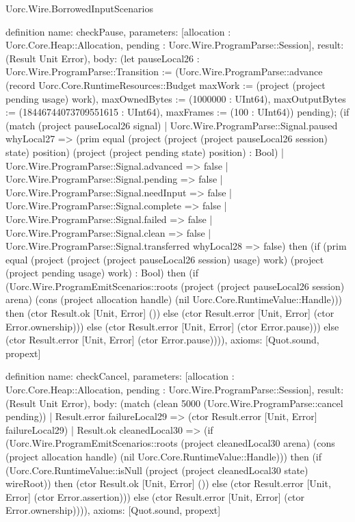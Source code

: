 \begin{lexlean}{Uorc.Wire.BorrowedInputScenarios}
\begin{semanticmodule}
definition{
  name: checkPause,
  parameters: [allocation : Uorc.Core.Heap::Allocation, pending : Uorc.Wire.ProgramParse::Session],
  result: (Result Unit Error),
  body: (let pauseLocal26 : Uorc.Wire.ProgramParse::Transition := (Uorc.Wire.ProgramParse::advance (record Uorc.Core.RuntimeResources::Budget {maxWork := (project (project pending usage) work), maxOwnedBytes := (1000000 : UInt64), maxOutputBytes := (18446744073709551615 : UInt64), maxFrames := (100 : UInt64)}) pending); (if (match (project pauseLocal26 signal)
    | Uorc.Wire.ProgramParse::Signal.paused whyLocal27 => (prim equal (project (project (project pauseLocal26 session) state) position) (project (project pending state) position) : Bool)
    | Uorc.Wire.ProgramParse::Signal.advanced => false
    | Uorc.Wire.ProgramParse::Signal.pending => false
    | Uorc.Wire.ProgramParse::Signal.needInput => false
    | Uorc.Wire.ProgramParse::Signal.complete => false
    | Uorc.Wire.ProgramParse::Signal.failed => false
    | Uorc.Wire.ProgramParse::Signal.clean => false
    | Uorc.Wire.ProgramParse::Signal.transferred whyLocal28 => false) then (if (prim equal (project (project (project pauseLocal26 session) usage) work) (project (project pending usage) work) : Bool) then (if (Uorc.Wire.ProgramEmitScenarios::roots (project (project pauseLocal26 session) arena) (cons (project allocation handle) (nil Uorc.Core.RuntimeValue::Handle))) then (ctor Result.ok [Unit, Error] ()) else (ctor Result.error [Unit, Error] (ctor Error.ownership))) else (ctor Result.error [Unit, Error] (ctor Error.pause))) else (ctor Result.error [Unit, Error] (ctor Error.pause)))),
  axioms: [Quot.sound, propext]
}

definition{
  name: checkCancel,
  parameters: [allocation : Uorc.Core.Heap::Allocation, pending : Uorc.Wire.ProgramParse::Session],
  result: (Result Unit Error),
  body: (match (clean 5000 (Uorc.Wire.ProgramParse::cancel pending))
    | Result.error failureLocal29 => (ctor Result.error [Unit, Error] failureLocal29)
    | Result.ok cleanedLocal30 => (if (Uorc.Wire.ProgramEmitScenarios::roots (project cleanedLocal30 arena) (cons (project allocation handle) (nil Uorc.Core.RuntimeValue::Handle))) then (if (Uorc.Core.RuntimeValue::isNull (project (project cleanedLocal30 state) wireRoot)) then (ctor Result.ok [Unit, Error] ()) else (ctor Result.error [Unit, Error] (ctor Error.assertion))) else (ctor Result.error [Unit, Error] (ctor Error.ownership)))),
  axioms: [Quot.sound, propext]
}


\end{semanticmodule}
\end{lexlean}
